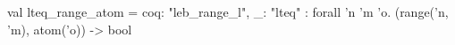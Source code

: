 val lteq_range_atom = {coq: "leb_range_l", _: "lteq"} : forall 'n 'm 'o. (range('n, 'm), atom('o)) -> bool
